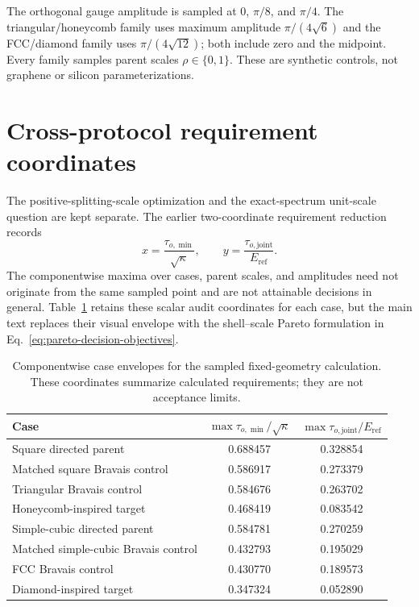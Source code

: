 The orthogonal gauge amplitude is sampled at $0$, $\pi/8$, and $\pi/4$. The
triangular/honeycomb family uses maximum amplitude $\pi/(4\sqrt6)$ and the FCC/diamond
family uses $\pi/(4\sqrt{12})$; both include zero and the midpoint. Every family samples
parent scales $\rho\in\{0,1\}$. These are synthetic controls, not graphene or silicon
parameterizations.

\section{Cross-protocol requirement coordinates}
\label{app:tolerance-requirements}

The positive-splitting-scale optimization and the exact-spectrum unit-scale question are
kept separate. The earlier two-coordinate requirement reduction records
\begin{equation}
 x=\frac{\tau_{o,\min}}{\sqrt\kappa},\qquad
 y=\frac{\tau_{o,\mathrm{joint}}}{E_{\mathrm{ref}}}.
 \label{eq:app-requirement-pair}
\end{equation}
The componentwise maxima over cases, parent scales, and amplitudes need not originate
from the same sampled point and are not attainable decisions in general.
Table~\ref{tab:app-case-requirements} retains these scalar audit coordinates for each
case, but the main text replaces their visual envelope with the shell--scale Pareto
formulation in Eq.~\eqref{eq:pareto-decision-objectives}.

\begin{table}[htbp]
\centering
\small
\caption{Componentwise case envelopes for the sampled fixed-geometry calculation.
These coordinates summarize calculated requirements; they are not acceptance limits.}
\label{tab:app-case-requirements}
\begin{tabular}{@{}lcc@{}}
\toprule
Case & $\max\tau_{o,\min}/\sqrt\kappa$ &
$\max\tau_{o,\mathrm{joint}}/E_{\mathrm{ref}}$ \\
\midrule
Square directed parent & 0.688457 & 0.328854 \\
Matched square Bravais control & 0.586917 & 0.273379 \\
Triangular Bravais control & 0.584676 & 0.263702 \\
Honeycomb-inspired target & 0.468419 & 0.083542 \\
Simple-cubic directed parent & 0.584781 & 0.270259 \\
Matched simple-cubic Bravais control & 0.432793 & 0.195029 \\
FCC Bravais control & 0.430770 & 0.189573 \\
Diamond-inspired target & 0.347324 & 0.052890 \\
\bottomrule
\end{tabular}
\end{table}

